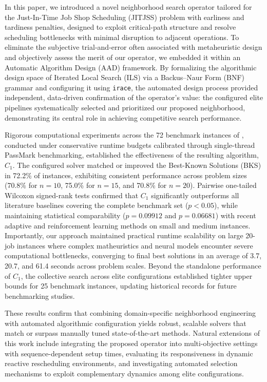 In this paper, we introduced a novel neighborhood search operator tailored for the Just-In-Time Job Shop Scheduling (JITJSS) problem with earliness and tardiness penalties, designed to exploit critical-path structure and resolve scheduling bottlenecks with minimal disruption to adjacent operations.
To eliminate the subjective trial-and-error often associated with metaheuristic design and objectively assess the merit of our operator, we embedded it within an Automatic Algorithm Design (AAD) framework.
By formalizing the algorithmic design space of Iterated Local Search (ILS) via a Backus--Naur Form (BNF) grammar and configuring it using \texttt{irace}, the automated design process provided independent, data-driven confirmation of the operator's value: the configured elite pipelines systematically selected and prioritized our proposed neighborhood, demonstrating its central role in achieving competitive search performance.

Rigorous computational experiments across the 72 benchmark instances of \citet{baptiste2008lagrangian}, conducted under conservative runtime budgets calibrated through single-thread PassMark benchmarking, established the effectiveness of the resulting algorithm, $C_1$.
The configured solver matched or improved the Best-Known Solutions (BKS) in 72.2\% of instances, exhibiting consistent performance across problem sizes (70.8\% for $n=10$, 75.0\% for $n=15$, and 70.8\% for $n=20$).
Pairwise one-tailed Wilcoxon signed-rank tests confirmed that $C_1$ significantly outperforms all literature baselines covering the complete benchmark set ($p < 0.05$), while maintaining statistical comparability ($p = 0.09912$ and $p = 0.06681$) with recent adaptive and reinforcement learning methods on small and medium instances.
Importantly, our approach maintained practical runtime scalability on large 20-job instances where complex matheuristics and neural models encounter severe computational bottlenecks, converging to final best solutions in an average of 3.7, 20.7, and 61.4 seconds across problem scales.
Beyond the standalone performance of $C_1$, the collective search across elite configurations established tighter upper bounds for 25 benchmark instances, updating historical records for future benchmarking studies.

These results confirm that combining domain-specific neighborhood engineering with automated algorithmic configuration yields robust, scalable solvers that match or surpass manually tuned state-of-the-art methods.
Natural extensions of this work include integrating the proposed operator into multi-objective settings with sequence-dependent setup times, evaluating its responsiveness in dynamic reactive rescheduling environments, and investigating automated selection mechanisms to exploit complementary dynamics among elite configurations.

